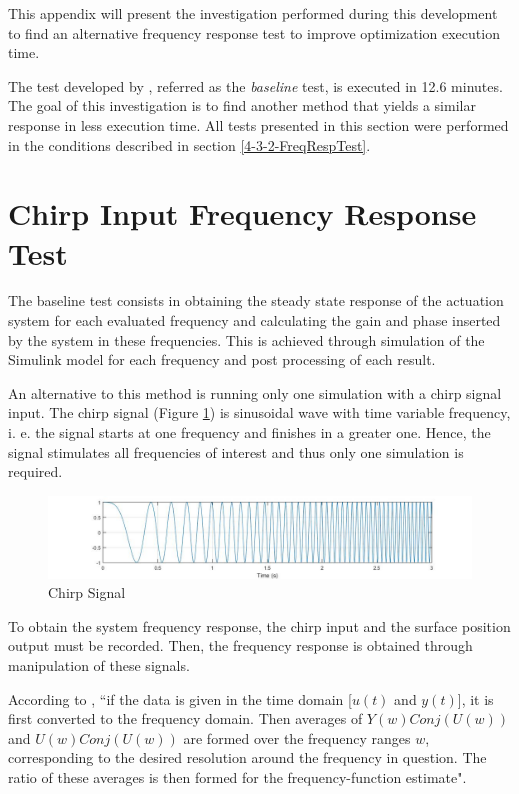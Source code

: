 
This appendix will present the investigation performed during this development to find an alternative frequency response test to improve optimization execution time. 

The test developed by \cite{Ballesteros}, referred as the \textit{baseline} test, is executed in 12.6 minutes. The goal of this investigation is to find another method that yields a similar response in less execution time. All tests presented in this section were performed in the conditions described in section \ref{4-3-2-FreqRespTest}.

\section{Chirp Input Frequency Response Test}

The baseline test consists in obtaining the steady state response of the actuation system for each evaluated frequency and calculating the gain and phase inserted by the system in these frequencies. This is achieved through simulation of the Simulink model for each frequency and post processing of each result.

An alternative to this method is running only one simulation with a chirp signal input. The chirp signal (Figure \ref{fig:A_ChirpSignal}) is sinusoidal wave with time variable frequency, i. e. the signal starts at one frequency and finishes in a greater one. Hence, the signal stimulates all frequencies of interest and thus only one simulation is required.

\begin{figure}[H]
	\centering
	\centerline{\includegraphics[width=1.1\textwidth]{Figuras/A.FrequencyResponseTest/A-ChirpSignal.jpg}}
	\caption{Chirp Signal}
	\label{fig:A_ChirpSignal}
\end{figure}

To obtain the system frequency response, the chirp input and the surface position output must be recorded. Then, the frequency response is obtained through manipulation of these signals.

According to \cite{IdtToolbox}, ``if the data is given in the time domain [$u(t)$ and $y(t)$], it is first converted to the frequency domain. Then averages of $Y(w)Conj(U(w))$ and $U(w)Conj(U(w))$ are formed over the frequency ranges $w$, corresponding to the desired resolution around the frequency in question. The ratio of these averages is then formed for the frequency-function estimate".


